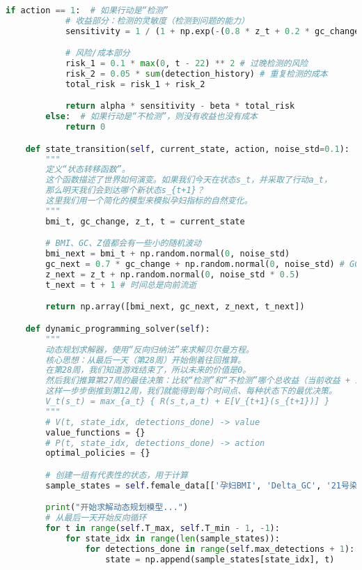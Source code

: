 \documentclass[UTF8, a4paper, 11pt]{ctexart}
\begin{document}
\begin{lstlisting}[language=Python, caption={问题四的解决方案脚本。}]
        if action == 1:  # 如果行动是“检测”
            # 收益部分：检测的灵敏度（检测到问题的能力）
            sensitivity = 1 / (1 + np.exp(-(0.8 * z_t + 0.2 * gc_change)))

            # 风险/成本部分
            risk_1 = 0.1 * max(0, t - 22) ** 2 # 过晚检测的风险
            risk_2 = 0.05 * sum(detection_history) # 重复检测的成本
            total_risk = risk_1 + risk_2

            return alpha * sensitivity - beta * total_risk
        else:  # 如果行动是“不检测”，则没有收益也没有成本
            return 0

    def state_transition(self, current_state, action, noise_std=0.1):
        """
        定义“状态转移函数”。
        这个函数描述了世界如何演变。如果我们今天在状态s_t，并采取了行动a_t，
        那么明天我们会到达哪个新状态s_{t+1}？
        这里我们用一个简化的模型来模拟孕妇指标的自然变化。
        """
        bmi_t, gc_change, z_t, t = current_state

        # BMI、GC、Z值都会有一些小的随机波动
        bmi_next = bmi_t + np.random.normal(0, noise_std)
        gc_next = 0.7 * gc_change + np.random.normal(0, noise_std) # GC变化具有一定的自相关性
        z_next = z_t + np.random.normal(0, noise_std * 0.5)
        t_next = t + 1 # 时间总是向前流逝

        return np.array([bmi_next, gc_next, z_next, t_next])

    def dynamic_programming_solver(self):
        """
        动态规划求解器，使用“反向归纳法”来求解贝尔曼方程。
        核心思想：从最后一天（第28周）开始倒着往回推算。
        在第28周，我们知道游戏结束了，所以未来的价值是0。
        然后我们推算第27周的最佳决策：比较“检测”和“不检测”哪个总收益（当前收益 + 未来期望收益）更高。
        这样一步步倒推到第12周，我们就能得到每个时间点、每种状态下的最优决策。
        V_t(s_t) = max_{a_t} { R(s_t,a_t) + E[V_{t+1}(s_{t+1})] }
        """
        # V(t, state_idx, detections_done) -> value
        value_functions = {}
        # P(t, state_idx, detections_done) -> action
        optimal_policies = {}

        # 创建一组有代表性的状态，用于计算
        sample_states = self.female_data[['孕妇BMI', 'Delta_GC', '21号染色体的Z值']].values

        print("开始求解动态规划模型...")
        # 从最后一天开始反向循环
        for t in range(self.T_max, self.T_min - 1, -1):
            for state_idx in range(len(sample_states)):
                for detections_done in range(self.max_detections + 1):
                    state = np.append(sample_states[state_idx], t)


\end{lstlisting}
\end{document}
